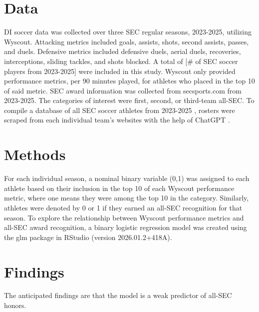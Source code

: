 \documentclass{article}
\begin{document}
\section{Data}
DI soccer data was collected over three SEC regular seasons, 2023-2025, utilizing Wyscout. Attacking metrics included goals, assists, shots, second assists, passes, and duels. Defensive metrics included defensive duels, aerial duels, recoveries, interceptions, sliding tackles, and shots blocked. A total of [\# of SEC soccer players from 2023-2025] were included in this study. Wyscout only provided performance metrics, per 90 minutes played, for athletes who placed in the top 10 of said metric.
SEC award information was collected from secsports.com from 2023-2025. The categories of interest were first, second, or third-team all-SEC.
To compile a database of all SEC soccer athletes from 2023-2025 \cite{sec2023,sec2024,sec2025}, rosters were scraped from each individual team’s websites with the help of ChatGPT \cite{chatgpt2026}.

\section{Methods}
For each individual season, a nominal binary variable (0,1) was assigned to each athlete based on their inclusion in the top 10 of each Wyscout performance metric, where one means they were among the top 10 in the category. Similarly, athletes were denoted by 0 or 1 if they earned an all-SEC recognition for that season. 
To explore the relationship between Wyscout performance metrics and all-SEC award recognition, a binary logistic regression model was created using the glm package in RStudio (version 2026.01.2+418A).

\section{Findings}
The anticipated findings are that the model is a weak predictor of all-SEC honors.
\end{document}
